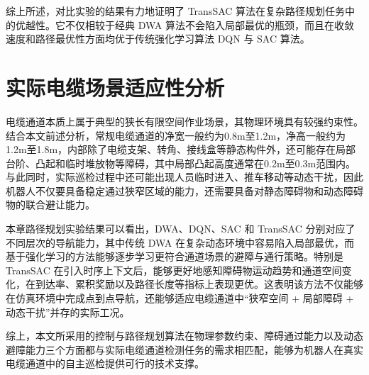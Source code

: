 综上所述，对比实验的结果有力地证明了 TransSAC 算法在复杂路径规划任务中的优越性。它不仅相较于经典 DWA 算法不会陷入局部最优的瓶颈，而且在收敛速度和路径最优性方面均优于传统强化学习算法 DQN 与 SAC 算法。

\section{实际电缆场景适应性分析}

电缆通道本质上属于典型的狭长有限空间作业场景，其物理环境具有较强约束性。结合本文前述分析，常规电缆通道的净宽一般约为0.8m至1.2m，净高一般约为1.2m至1.8m，内部除了电缆支架、转角、接线盒等静态构件外，还可能存在局部台阶、凸起和临时堆放物等障碍，其中局部凸起高度通常在0.2m至0.3m范围内。与此同时，实际巡检过程中还可能出现人员临时进入、推车移动等动态干扰，因此机器人不仅要具备稳定通过狭窄区域的能力，还需要具备对静态障碍物和动态障碍物的联合避让能力。

本章路径规划实验结果可以看出，DWA、DQN、SAC 和 TransSAC 分别对应了不同层次的导航能力，其中传统 DWA 在复杂动态环境中容易陷入局部最优，而基于强化学习的方法能够逐步学习更符合通道场景的避障与通行策略。特别是 TransSAC 在引入时序上下文后，能够更好地感知障碍物运动趋势和通道空间变化，在到达率、累积奖励以及路径长度等指标上表现更优。这表明该方法不仅能够在仿真环境中完成点到点导航，还能够适应电缆通道中“狭窄空间 + 局部障碍 + 动态干扰”并存的实际工况。

综上，本文所采用的控制与路径规划算法在物理参数约束、障碍通过能力以及动态避障能力三个方面都与实际电缆通道检测任务的需求相匹配，能够为机器人在真实电缆通道中的自主巡检提供可行的技术支撑。

